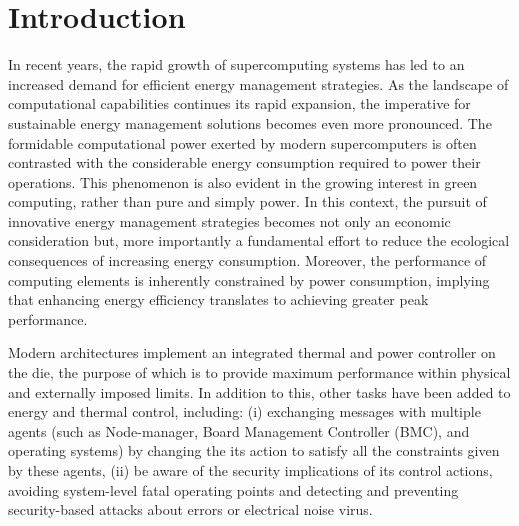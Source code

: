 

\section{Introduction}

In recent years, the rapid growth of supercomputing systems has led to an increased demand for efficient energy management strategies. As the landscape of computational capabilities continues its rapid expansion, the imperative for sustainable energy management solutions becomes even more pronounced. The formidable computational power exerted by modern supercomputers is often contrasted with the considerable energy consumption required to power their operations. This phenomenon is also evident in the growing interest in green computing, rather than pure and simply power\cite{Green}\cite{Green2}\cite{hardvard}. In this context, the pursuit of innovative energy management strategies becomes not only an economic consideration but, more importantly a fundamental effort to reduce the ecological consequences of increasing energy consumption. Moreover, the performance of computing elements is inherently constrained by power consumption, implying that enhancing energy efficiency translates to achieving greater peak performance.

Modern architectures implement an integrated thermal and power controller on the die, the purpose of which is to provide maximum performance within physical and externally imposed limits. In addition to this, other tasks have been added to energy and thermal control, including: (i) exchanging messages with multiple agents (such as Node-manager, Board Management Controller (BMC), and operating systems) by changing the its action to satisfy all the constraints given by these agents, (ii) be aware of the security implications of its control actions, avoiding system-level fatal operating points and detecting and preventing security-based attacks about errors\cite{fbv} or electrical noise virus\cite{pnv}.

